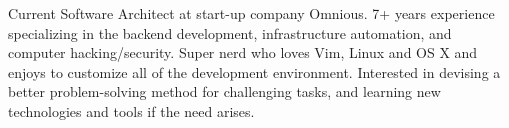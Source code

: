 

\begin{cvparagraph}



Current Software Architect at start-up company Omnious. 7+ years experience specializing in the backend development, infrastructure automation, and computer hacking/security. Super nerd who loves Vim, Linux and OS X and enjoys to customize all of the development environment. Interested in devising a better problem-solving method for challenging tasks, and learning new technologies and tools if the need arises.
\end{cvparagraph}
 